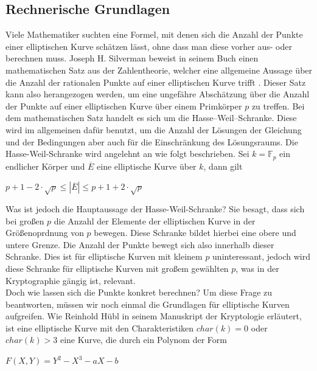 \subsection{Rechnerische Grundlagen} \label{sec:rechengrundlagen}
Viele Mathematiker suchten eine Formel, mit denen sich die Anzahl der Punkte einer elliptischen Kurve schätzen lässt, ohne dass man diese vorher aus- oder berechnen muss. Joseph H. Silverman beweist in seinem Buch einen mathematischen Satz aus der Zahlentheorie, welcher eine allgemeine Aussage über die Anzahl der rationalen Punkte auf einer elliptischen Kurve trifft \cite[S. 138]{JosephH.Silverman.2009}. Dieser Satz kann also herangezogen werden, um eine ungefähre Abschätzung über die Anzahl der Punkte auf einer elliptischen Kurve über einem Primkörper $p$ zu treffen. Bei dem mathematischen Satz handelt es sich um die Hasse–Weil–Schranke. Diese wird im allgemeinen dafür benutzt, um die Anzahl der Lösungen der Gleichung und der Bedingungen aber auch für die Einschränkung des Lösungsraums. Die Hasse-Weil-Schranke wird angelehnt an \cite[S. 181]{Dr.ReinholdHubl.2022} wie folgt beschrieben. Sei $k = \mathbb{F}_p$ ein endlicher Körper und $\overline{E}$ eine elliptische Kurve über $k$, dann gilt
\begin{center}
$p + 1 - 2 \cdot \sqrt{p} \leq | \overline{E} | \leq p + 1 + 2 \cdot \sqrt{p}$
\end{center} 

Was ist jedoch die Hauptaussage der Hasse-Weil-Schranke? Sie besagt, dass sich bei großen $p$ die Anzahl der Elemente der elliptischen Kurve in der Größenoprdnung von $p$ bewegen. Diese Schranke bildet hierbei eine obere und untere Grenze. Die Anzahl der Punkte bewegt sich also innerhalb dieser Schranke. Dies ist für elliptische Kurven mit kleinem $p$ uninteressant, jedoch wird diese Schranke für elliptische Kurven mit großem gewählten $p$, was in der Kryptographie gängig ist, relevant.\\


Doch wie lassen sich die Punkte konkret berechnen? Um diese Frage zu beantworten, müssen wir noch einmal die Grundlagen für elliptische Kurven aufgreifen. Wie Reinhold Hübl in seinem Manuskript der Kryptologie \cite[S. 157]{Dr.ReinholdHubl.2022} erläutert, ist eine elliptische Kurve mit den Charakteristiken $char(k) = 0$ oder $char(k) > 3$ eine Kurve, die durch ein Polynom der Form
\begin{center}
$F(X, Y) = Y^{2} - X^{3} - aX - b$
\end{center} 

